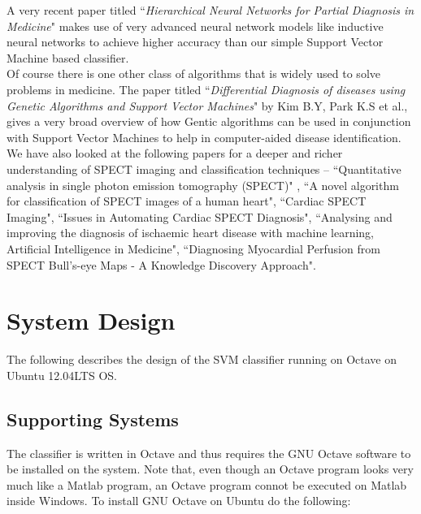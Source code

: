 \documentclass[11pt,a4paper]{report}
\begin{document}
{A very recent paper titled ``\emph{Hierarchical Neural Networks for Partial Diagnosis in Medicine}"\cite{HN} makes use of very advanced neural network models like inductive neural networks to achieve higher accuracy than our simple Support Vector Machine based classifier.\\

\newpage
Of course there is one other class of algorithms that is widely used to solve problems in medicine. The paper titled ``\emph{Differential Diagnosis of diseases using Genetic Algorithms and Support Vector Machines}" by Kim B.Y, Park K.S et al., gives a very broad overview of how Gentic algorithms can be used in conjunction with Support Vector Machines to help in computer-aided disease identification.\\

We have also looked at the following papers for a deeper and richer understanding of SPECT imaging and classification techniques -- ``Quantitative analysis in single photon emission tomography (SPECT)" \cite{QA}, ``A novel algorithm for classification of SPECT images of a human heart"\cite{NA}, ``Cardiac SPECT Imaging"\cite{CS}, ``Issues in Automating Cardiac SPECT Diagnosis"\cite{IS}, ``Analysing and improving the diagnosis of ischaemic heart disease with machine learning, Artificial Intelligence in Medicine"\cite{AI}, ``Diagnosing Myocardial Perfusion from SPECT Bull’s-eye Maps - A Knowledge Discovery Approach".\\





\chapter{System Design}

The following describes the design of the SVM classifier running on Octave on Ubuntu 12.04LTS OS.

\section{Supporting Systems}

The classifier is written in Octave and thus requires the GNU Octave software to be installed on the system. Note that, even though an Octave program looks very much like a Matlab program, an Octave program connot be executed on Matlab inside Windows. To install GNU Octave on Ubuntu do the following: \\

}
\end{document}
